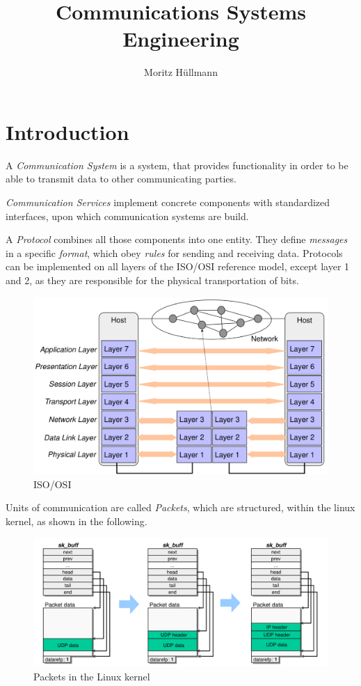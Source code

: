 \documentclass[english]{panikzettel}
\title{Communications Systems Engineering}
\author{Moritz Hüllmann}
\begin{document}
	\maketitle
	\setcounter{tocdepth}{2}
	\tableofcontents

	\newpage
	\section{Introduction}
	\label{s-introduction}
	
	A \textit{Communication System} is a system, that provides functionality in order to be able to transmit data to other communicating parties.

	\textit{Communication Services} implement concrete components with standardized interfaces, upon which communication systems are build.

	A \textit{Protocol} combines all those components into one entity.
	They define \textit{messages} in a specific \textit{format}, which obey \textit{rules} for sending and receiving data.
	Protocols can be implemented on all layers of the ISO/OSI reference model, except layer 1 and 2, as they are responsible for the physical transportation of bits.

	\begin{figure}[H]
		\centering
		\includegraphics[width=\textwidth]{img/0-iso-osi.png}
		\caption{ISO/OSI}
		\label{img-0-iso-osi}
	\end{figure}
	
	Units of communication are called \textit{Packets}, which are structured, within the linux kernel, as shown in the following.

	\begin{figure}[H]
		\centering
		\includegraphics[width=\textwidth]{img/0-paket-kernel-rep.png}
		\caption{Packets in the Linux kernel}
		\label{img-0-paket-kernel-rep}
	\end{figure}
	
\end{document}
